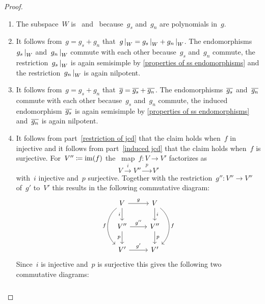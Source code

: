 \begin{proof}
  \label{properties of jcd proof}
  \leavevmode
  \begin{enumerate}
    \item
      The subspace~$W$ is~ and~ because~$g_s$ and~$g_n$ are polynomials in~$g$.
    \item
      It follows from~$g = g_s + g_n$ that~$\restrict{g}{W} = \restrict{g_s}{W} + \restrict{g_n}{W}$.
      The endomorphisms~$\restrict{g_s}{W}$ and~$\restrict{g_n}{W}$ commute with each other because~$g_s$ and~$g_n$ commute, the restriction~$\restrict{g_s}{W}$ is again semisimple by \cref{properties of ss endomorphisms} and the restriction~$\restrict{g_n}{W}$ is again nilpotent.
    \item
      It follows from~$g = g_s + g_n$ that~$\overline{g} = \overline{g_s} + \overline{g_n}$.
      The endomorphisms~$\overline{g_s}$ and~$\overline{g_n}$ commute with each other because~$g_s$ and~$g_n$ commute, the induced endomorphism~$\overline{g_s}$ is again semisimple by \cref{properties of ss endomorphisms} and~$\overline{g_n}$ is again nilpotent.
    \item
      It follows from part~\ref*{restriction of jcd} that the claim holds when~$f$ in injective and it follows from part~\ref*{induced jcd} that the claim holds when~$f$ is surjective.
      For~$V'' \coloneqq \operatorname{im}(f)$ the~ map~$f \colon V \to V'$ factorizes as
      \[
        V
        \xrightarrow{\enspace i \enspace}
        V''
        \xrightarrow{\enspace p \enspace}
        V'
      \]
      with~$i$ injective and~$p$ surjective.
      Together with the restriction~$g'' \colon V'' \to V''$ of~$g'$ to~$V'$ this results in the following commutative diagram:
      \[
        \begin{tikzcd}
            V
            \arrow{r}[above]{g}
            \arrow{d}[left]{i}
            \arrow[bend right = 50]{dd}[left]{f}
          & V
            \arrow{d}[right]{i}
            \arrow[bend left = 50]{dd}[right]{f}
          \\
            V''
            \arrow{r}[above]{g''}
            \arrow{d}[left]{p}
          & V''
            \arrow{d}[right]{p}
          \\
            V'
            \arrow{r}[above]{g'}
          & V'
        \end{tikzcd}
      \]
      Since~$i$ is injective and~$p$ is surjective this gives the following two commutative diagrams:
      \[
        \begin{tikzcd}

\end{tikzcd}\]
\end{enumerate}
\end{proof}
